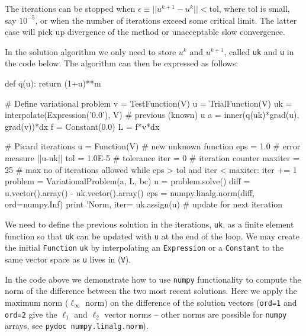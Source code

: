 The iterations can be stopped when $\epsilon\equiv ||u^{k+1}-u^k|| 
< \mbox{tol}$, where $\mbox{tol}$ is small, say $10^{-5}$, or
when the number of iterations exceed some critical limit. The latter
case will pick up divergence of the method or unacceptable slow
convergence.

In the solution algorithm we only need to store $u^k$ and $u^{k+1}$,
called {\fontsize{10pt}{10pt}\texttt{uk}} and {\fontsize{10pt}{10pt}\texttt{u}} in the code below.
The algorithm can then be expressed as follows:
\begin{python}
def q(u):
    return (1+u)**m

# Define variational problem
v = TestFunction(V)
u = TrialFunction(V)
uk = interpolate(Expression('0.0'), V)  # previous (known) u
a = inner(q(uk)*grad(u), grad(v))*dx
f = Constant(0.0)
L = f*v*dx

# Picard iterations
u = Function(V)     # new unknown function
eps = 1.0           # error measure ||u-uk||
tol = 1.0E-5        # tolerance
iter = 0            # iteration counter
maxiter = 25        # max no of iterations allowed
while eps > tol and iter < maxiter:
    iter += 1
    problem = VariationalProblem(a, L, bc)
    u = problem.solve()
    diff = u.vector().array() - uk.vector().array()
    eps = numpy.linalg.norm(diff, ord=numpy.Inf)
    print 'Norm, iter=%
    uk.assign(u)    # update for next iteration
\end{python}
We need to define the previous solution in the iterations, {\fontsize{10pt}{10pt}\texttt{uk}},
as a finite element function so that {\fontsize{10pt}{10pt}\texttt{uk}} can be updated with
{\fontsize{10pt}{10pt}\texttt{u}} at the end of the loop. We may create the initial
{\fontsize{10pt}{10pt}\texttt{Function}} {\fontsize{10pt}{10pt}\texttt{uk}}
by interpolating
an {\fontsize{10pt}{10pt}\texttt{Expression}} or a {\fontsize{10pt}{10pt}\texttt{Constant}} 
to the same vector space as {\fontsize{10pt}{10pt}\texttt{u}} lives in ({\fontsize{10pt}{10pt}\texttt{V}}).

In the code above we demonstrate how to use 
{\fontsize{10pt}{10pt}\texttt{numpy}} functionality to compute the norm of
the difference between the two most recent solutions. Here we apply
the maximum norm ($\ell_\infty$ norm) on the difference of the solution vectors
({\fontsize{10pt}{10pt}\texttt{ord=1}} and {\fontsize{10pt}{10pt}\texttt{ord=2}} give the $\ell_1$ and $\ell_2$ vector
norms -- other norms are possible for {\fontsize{10pt}{10pt}\texttt{numpy}} arrays, 
see {\fontsize{10pt}{10pt}\texttt{pydoc numpy.linalg.norm}}).

